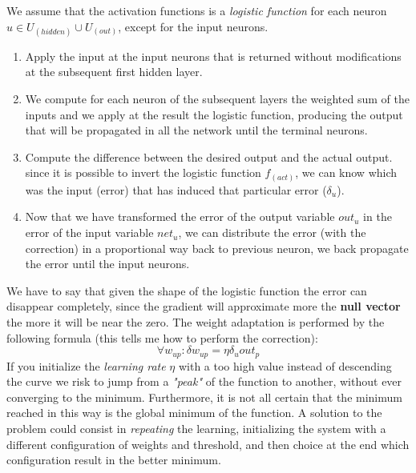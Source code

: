 \documentclass{article}
\begin{document}
We assume that the activation functions is a \textit{logistic function} for each neuron
$u\in U_{(hidden)}\cup U_{(out)}$, except for the input neurons.
\begin{enumerate}
    \item Apply the input at the input neurons that is returned without modifications
          at the subsequent first hidden layer.
    \item We compute for each neuron of the subsequent layers the weighted sum of the
          inputs and we apply at the result the logistic function, producing the output
          that will be propagated in all the network until the terminal neurons.
    \item Compute the difference between the desired output and the actual output. since
          it is possible to invert the logistic function $f_{(act)}$, we can know which was
          the input (error) that has induced that particular error ($\delta_u$).
    \item Now that we have transformed the error of the output variable $out_u$ in
          the error of the input variable $net_u$, we can distribute the error (with the correction)
          in a proportional way back to previous neuron, we back propagate the error until the
          input neurons.
\end{enumerate}
We have to say that given the shape of the logistic function the error can disappear
completely, since the gradient will approximate more the \textbf{null vector} the
more it will be near the zero.
\newline\newline
The weight adaptation is performed by the following formula (this tells me how to perform the correction):
$$\forall w_{up}:\delta w_{up}=\eta \delta_u out_p$$
If you initialize the \textit{learning rate} $\eta$ with a too high value instead
of descending the curve we risk to jump from a \textit{"peak"} of the function to another,
without ever converging to the minimum. Furthermore, it is not all certain that the minimum
reached in this way is the global minimum of the function.
\newline\newline
A solution to the problem could consist in \textit{repeating} the learning, initializing
the system with a different configuration of weights and threshold, and then choice
at the end which configuration result in the better minimum.
\end{document}
